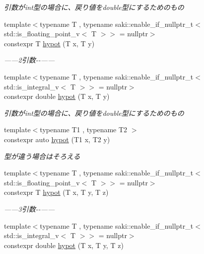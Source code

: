 \begin{DoxyCompactItemize}
\begin{DoxyCompactList}\small\item\em 引数がint型の場合に、戻り値をdouble型にするためのもの \end{DoxyCompactList}\item 
{\footnotesize template$<$typename T , typename saki\+::enable\+\_\+if\+\_\+nullptr\+\_\+t$<$ std\+::is\+\_\+floating\+\_\+point\+\_\+v$<$ T $>$$>$  = nullptr$>$ }\\constexpr T \mbox{\hyperlink{namespacesaki_a0dfe75bfa0e5223a0390c5e2941e69bc}{hypot}} (T x, T y)
\begin{DoxyCompactList}\small\item\em ------2引数-\/-\/------ \end{DoxyCompactList}\item 
{\footnotesize template$<$typename T , typename saki\+::enable\+\_\+if\+\_\+nullptr\+\_\+t$<$ std\+::is\+\_\+integral\+\_\+v$<$ T $>$$>$  = nullptr$>$ }\\constexpr double \mbox{\hyperlink{namespacesaki_ad888da163ba5c006d664d564fb48f7a7}{hypot}} (T x, T y)
\begin{DoxyCompactList}\small\item\em 引数がint型の場合に、戻り値をdouble型にするためのもの \end{DoxyCompactList}\item 
{\footnotesize template$<$typename T1 , typename T2 $>$ }\\constexpr auto \mbox{\hyperlink{namespacesaki_add6327614e0d389d7545d1ffb151602b}{hypot}} (T1 x, T2 y)
\begin{DoxyCompactList}\small\item\em 型が違う場合はそろえる \end{DoxyCompactList}\item 
{\footnotesize template$<$typename T , typename saki\+::enable\+\_\+if\+\_\+nullptr\+\_\+t$<$ std\+::is\+\_\+floating\+\_\+point\+\_\+v$<$ T $>$$>$  = nullptr$>$ }\\constexpr T \mbox{\hyperlink{namespacesaki_a56768ecf1270205a8c9b3ac8cdf4a590}{hypot}} (T x, T y, T z)
\begin{DoxyCompactList}\small\item\em ------3引数-\/-\/------ \end{DoxyCompactList}\item 
{\footnotesize template$<$typename T , typename saki\+::enable\+\_\+if\+\_\+nullptr\+\_\+t$<$ std\+::is\+\_\+integral\+\_\+v$<$ T $>$$>$  = nullptr$>$ }\\constexpr double \mbox{\hyperlink{namespacesaki_ad56e1232bb063b3bc0e7cf2b3f655247}{hypot}} (T x, T y, T z)

\end{DoxyCompactItemize}
